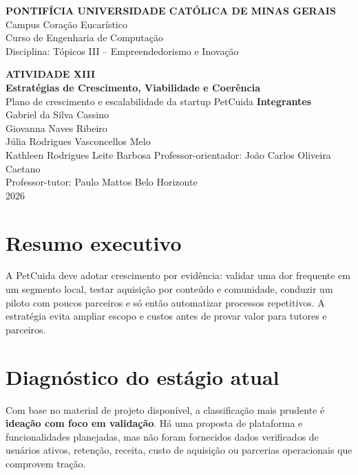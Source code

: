 \documentclass[12pt,a4paper]{article}
\begin{document}
\begin{titlepage}
\begin{center}
\vspace*{1.5cm}
{\Large\textbf{PONTIFÍCIA UNIVERSIDADE CATÓLICA DE MINAS GERAIS}}\\[0.3cm]
Campus Coração Eucarístico\\
Curso de Engenharia de Computação\\
Disciplina: Tópicos III -- Empreendedorismo e Inovação
\vspace{2.2cm}

{\LARGE\textbf{ATIVIDADE XIII}}\\[0.4cm]
{\Large\textbf{Estratégias de Crescimento, Viabilidade e Coerência}}\\[0.5cm]
{\large Plano de crescimento e escalabilidade da startup PetCuida}
\vfill
\textbf{Integrantes}\\[0.25cm]
Gabriel da Silva Cassino\\
Giovanna Naves Ribeiro\\
Júlia Rodrigues Vasconcellos Melo\\
Kathleen Rodrigues Leite Barbosa
\vfill
Professor-orientador: João Carlos Oliveira Caetano\\
Professor-tutor: Paulo Mattos
\vfill
Belo Horizonte\\2026
\end{center}
\end{titlepage}
\tableofcontents
\newpage

\section{Resumo executivo}
A PetCuida deve adotar crescimento por evidência: validar uma dor frequente em um segmento local, testar aquisição por conteúdo e comunidade, conduzir um piloto com poucos parceiros e só então automatizar processos repetitivos. A estratégia evita ampliar escopo e custos antes de provar valor para tutores e parceiros.

\section{Diagnóstico do estágio atual}
Com base no material de projeto disponível, a classificação mais prudente é \textbf{ideação com foco em validação}. Há uma proposta de plataforma e funcionalidades planejadas, mas não foram fornecidos dados verificados de usuários ativos, retenção, receita, custo de aquisição ou parcerias operacionais que comprovem tração.
\end{document}

